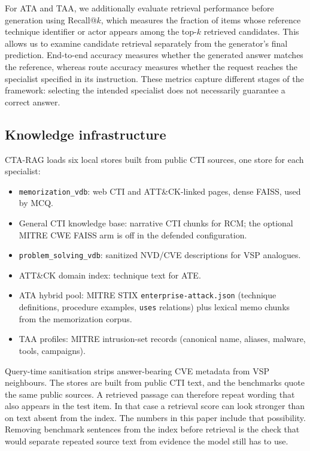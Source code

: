 \documentclass[5p,times,authoryear]{elsarticle}
\begin{document}
For ATA and TAA, we additionally evaluate retrieval performance before generation using Recall@$k$, which measures the fraction of items whose reference technique identifier or actor appears among the top-$k$ retrieved candidates. This allows us to examine candidate retrieval separately from the generator's final prediction. End-to-end accuracy measures whether the generated answer matches the reference, whereas route accuracy measures whether the request reaches the specialist specified in its instruction. These metrics capture different stages of the framework: selecting the intended specialist does not necessarily guarantee a correct answer.

\subsection{Knowledge infrastructure}\label{sec:kb}
CTA-RAG loads six local stores built from public CTI sources, one store for each specialist:

\begin{itemize}[leftmargin=*,nosep,topsep=2pt]
\item \texttt{memorization\_vdb}: web CTI and ATT\&CK-linked pages, dense FAISS, used by MCQ.
\item General CTI knowledge base: narrative CTI chunks for RCM; the optional MITRE CWE FAISS arm is off in the defended configuration.
\item \texttt{problem\_solving\_vdb}: sanitized NVD/CVE descriptions for VSP analogues.
\item ATT\&CK domain index: technique text for ATE.
\item ATA hybrid pool: MITRE STIX \texttt{enterprise-attack.json} (technique definitions, procedure examples, \texttt{uses} relations) plus lexical memo chunks from the memorization corpus.
\item TAA profiles: MITRE intrusion-set records (canonical name, aliases, malware, tools, campaigns).
\end{itemize}

Query-time sanitisation strips answer-bearing CVE metadata from VSP neighbours. The stores are built from public CTI text, and the benchmarks quote the same public sources. A retrieved passage can therefore repeat wording that also appears in the test item. In that case a retrieval score can look stronger than on text absent from the index. The numbers in this paper include that possibility. Removing benchmark sentences from the index before retrieval is the check that would separate repeated source text from evidence the model still has to use.
\end{document}
